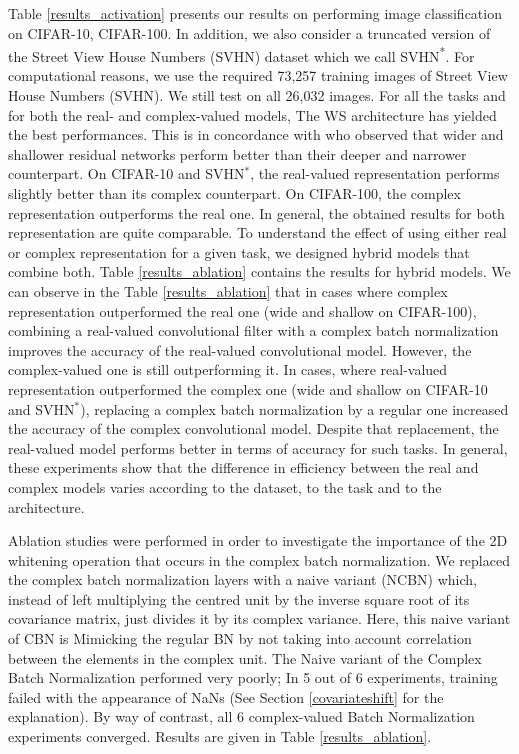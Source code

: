 \documentclass{article}
\begin{document}
Table \ref{results_activation} presents our results on performing image classification on CIFAR-10, CIFAR-100. In addition, we also consider a truncated version of the Street View House Numbers (SVHN) dataset which we call SVHN\textsuperscript{*}. For computational reasons, we use the required 73,257 training images of Street View House Numbers (SVHN). We still test on all 26,032 images. For all the tasks and for both the real- and complex-valued models, The WS architecture has yielded the best performances. This is in concordance with \cite{zagoruyko2016wide} who observed that wider and shallower residual networks perform better than their deeper and narrower counterpart. On CIFAR-10 and SVHN$^{*}$, the real-valued representation performs slightly better than its complex counterpart. On CIFAR-100, the complex representation outperforms the real one. In general, the obtained results for both representation are quite comparable. To understand the effect of using either real or complex representation for a given task, we designed hybrid models that combine both. Table \ref{results_ablation} contains the results for hybrid models. We can observe in the Table \ref{results_ablation} that in cases where complex representation outperformed the real one (wide and shallow on CIFAR-100), combining a real-valued convolutional filter with a complex batch normalization improves the accuracy of the real-valued convolutional model. However, the complex-valued one is still outperforming it. In cases, where real-valued representation outperformed the complex one (wide and shallow on CIFAR-10 and SVHN$^{*}$), replacing a complex batch normalization by a regular one increased the accuracy of the complex convolutional model. Despite that replacement, the real-valued model performs better in terms of accuracy for such tasks. In general, these experiments show that the difference in efficiency between the real and complex models varies according to the dataset, to the task and to the architecture.

Ablation studies were performed in order to investigate the importance of the 2D whitening operation that occurs in the complex batch normalization. We replaced the complex batch normalization layers with a naive variant (NCBN) which, instead of left multiplying the centred unit by the inverse square root of its covariance matrix, just divides it by its complex variance. Here, this naive variant of CBN is Mimicking the regular BN by not taking into account correlation between the elements in the complex unit. The Naive variant of the Complex Batch Normalization performed very poorly; In 5 out of 6 experiments, training failed with the appearance of NaNs (See Section \ref{covariateshift} for the explanation). By way of contrast, all 6 complex-valued Batch Normalization experiments converged. Results are given in Table \ref{results_ablation}.
\end{document}

